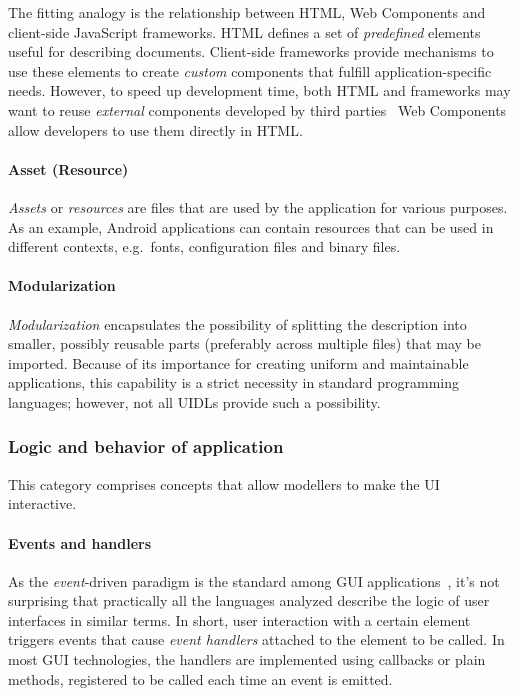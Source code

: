 The fitting analogy is the relationship between HTML, Web Components and client-side JavaScript frameworks.
HTML defines a set of \emph{predefined} elements useful for describing documents.
Client-side frameworks provide mechanisms to use these elements to create \emph{custom} components that fulfill application-specific needs.
However, to speed up development time, both HTML and frameworks may want to reuse \emph{external} components developed by third parties \textendash\ Web Components allow developers to use them directly in HTML\@.

\paragraph{Asset (Resource)}
\emph{Assets} or \emph{resources} are files that are used by the application for various purposes.
As an example, Android applications can contain resources that can be used in different contexts, e.g.\ fonts, configuration files and binary files.

\paragraph{Modularization}
\emph{Modularization} encapsulates the possibility of splitting the description into smaller, possibly reusable parts (preferably across multiple files) that may be imported.
Because of its importance for creating uniform and maintainable applications, this capability is a strict necessity in standard programming languages;
however, not all UIDLs provide such a possibility.

\subsubsection{Logic and behavior of application}

This category comprises concepts that allow modellers to make the UI interactive.

\paragraph{Events and handlers}
As the \emph{event}-driven paradigm is the standard among GUI applications~\cite{wang2016event}, it's not surprising that practically all the languages analyzed describe the logic of user interfaces in similar terms.
In short, user interaction with a certain element triggers events that cause \emph{event handlers} attached to the element to be called.
In most GUI technologies, the handlers are implemented using callbacks or plain methods, registered to be called each time an event is emitted.

